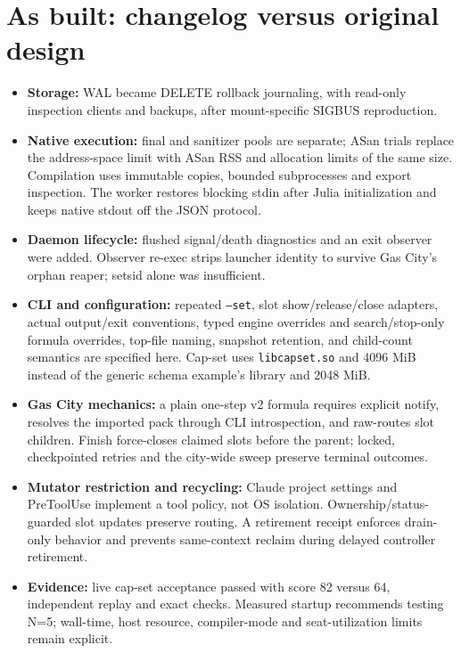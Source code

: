 \documentclass[11pt]{article}
\newcommand{\code}[1]{\texttt{#1}}
\begin{document}
\section{As built: changelog versus original design}
\begin{itemize}
\item \textbf{Storage:} WAL became DELETE rollback journaling, with read-only
inspection clients and backups, after mount-specific SIGBUS reproduction.
\item \textbf{Native execution:} final and sanitizer pools are separate;
ASan trials replace the address-space limit with ASan RSS and allocation
limits of the same size. Compilation uses immutable
copies, bounded subprocesses and export inspection. The worker restores blocking
stdin after Julia initialization and keeps native stdout off the JSON protocol.
\item \textbf{Daemon lifecycle:} flushed signal/death diagnostics and an exit
observer were added. Observer re-exec strips launcher identity to survive Gas
City's orphan reaper; setsid alone was insufficient.
\item \textbf{CLI and configuration:} repeated \code{--set}, slot
show/release/close adapters, actual output/exit conventions, typed engine
overrides and search/stop-only formula overrides, top-file naming, snapshot retention, and child-count semantics are
specified here. Cap-set uses \code{libcapset.so} and 4096 MiB instead of the
generic schema example's library and 2048 MiB.
\item \textbf{Gas City mechanics:} a plain one-step v2 formula requires explicit
notify, resolves the imported pack through CLI introspection, and raw-routes
slot children. Finish force-closes claimed slots before the parent; locked,
checkpointed retries and the city-wide sweep preserve terminal outcomes.
\item \textbf{Mutator restriction and recycling:} Claude project settings and
PreToolUse implement a tool policy, not OS isolation. Ownership/status-guarded
slot updates preserve routing. A retirement receipt enforces drain-only behavior
and prevents same-context reclaim during delayed controller retirement.
\item \textbf{Evidence:} live cap-set acceptance passed with score 82 versus 64,
independent replay and exact checks. Measured startup recommends testing N=5;
wall-time, host resource, compiler-mode and seat-utilization limits remain explicit.
\end{itemize}
\end{document}
